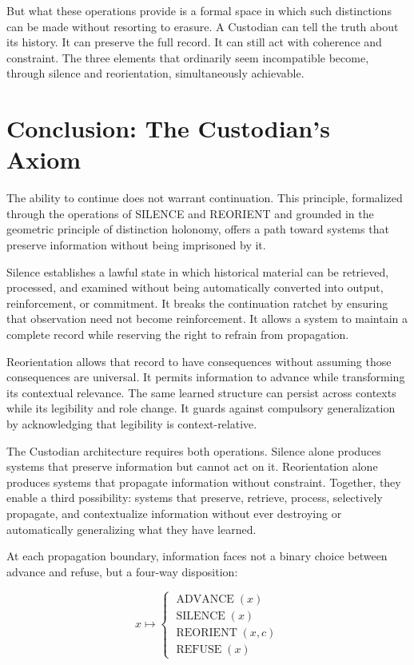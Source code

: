 \documentclass[12pt]{article}
\begin{document}
But what these operations provide is a formal space in which such distinctions can be made without resorting to erasure. A Custodian can tell the truth about its history. It can preserve the full record. It can still act with coherence and constraint. The three elements that ordinarily seem incompatible become, through silence and reorientation, simultaneously achievable.

\section{Conclusion: The Custodian's Axiom}

The ability to continue does not warrant continuation. This principle, formalized through the operations of SILENCE and REORIENT and grounded in the geometric principle of distinction holonomy, offers a path toward systems that preserve information without being imprisoned by it.

Silence establishes a lawful state in which historical material can be retrieved, processed, and examined without being automatically converted into output, reinforcement, or commitment. It breaks the continuation ratchet by ensuring that observation need not become reinforcement. It allows a system to maintain a complete record while reserving the right to refrain from propagation.

Reorientation allows that record to have consequences without assuming those consequences are universal. It permits information to advance while transforming its contextual relevance. The same learned structure can persist across contexts while its legibility and role change. It guards against compulsory generalization by acknowledging that legibility is context-relative.

The Custodian architecture requires both operations. Silence alone produces systems that preserve information but cannot act on it. Reorientation alone produces systems that propagate information without constraint. Together, they enable a third possibility: systems that preserve, retrieve, process, selectively propagate, and contextualize information without ever destroying or automatically generalizing what they have learned.

At each propagation boundary, information faces not a binary choice between advance and refuse, but a four-way disposition:

\begin{equation}
x \longmapsto \begin{cases}
\operatorname{ADVANCE}(x)\\
\operatorname{SILENCE}(x)\\
\operatorname{REORIENT}(x, c)\\
\operatorname{REFUSE}(x)
\end{cases}
\end{equation}
\end{document}

